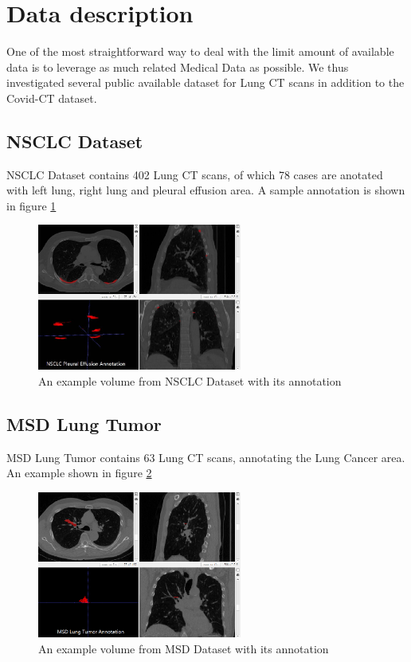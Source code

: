 \section{Data description}
One of the most straightforward way to deal with the limit amount of available data is to leverage as much related Medical Data as possible. We thus investigated several public available dataset for Lung CT scans in addition to the Covid-CT dataset.

\subsection{NSCLC Dataset}
NSCLC Dataset contains 402 Lung CT scans, of which 78 cases are anotated with left lung, right lung and pleural effusion area. A sample annotation is shown in figure \ref{fig:NSCLC_example}
\begin{figure}[h]
	\centering
	\includegraphics[width=0.6\textwidth]{img/Dataset/NSCLC}
	\caption{An example volume from NSCLC Dataset with its annotation}
	\label{fig:NSCLC_example}
\end{figure}

\subsection{MSD Lung Tumor}
MSD Lung Tumor contains 63 Lung CT scans, annotating the Lung Cancer area. An example shown in figure \ref{fig:MSD_example}
\begin{figure}[h]
	\centering
	\includegraphics[width=0.6\textwidth]{img/Dataset/MSD}
	\caption{An example volume from MSD Dataset with its annotation}
	\label{fig:MSD_example}
\end{figure}

